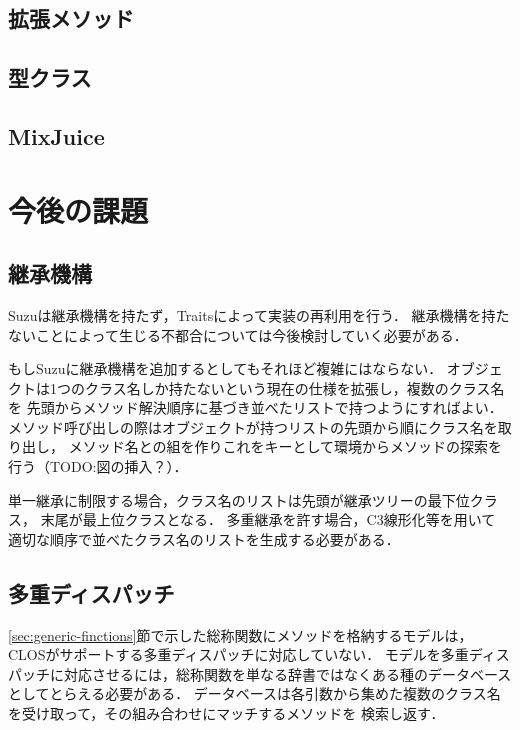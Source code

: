 \documentclass{ipsjprosym}
\begin{document}
\subsection{拡張メソッド}

\subsection{型クラス}

\subsection{MixJuice}


\section{今後の課題}

\subsection{継承機構}

Suzuは継承機構を持たず，Traitsによって実装の再利用を行う．
継承機構を持たないことによって生じる不都合については今後検討していく必要がある．

もしSuzuに継承機構を追加するとしてもそれほど複雑にはならない．
オブジェクトは1つのクラス名しか持たないという現在の仕様を拡張し，複数のクラス名を
先頭からメソッド解決順序に基づき並べたリストで持つようにすればよい．
メソッド呼び出しの際はオブジェクトが持つリストの先頭から順にクラス名を取り出し，
メソッド名との組を作りこれをキーとして環境からメソッドの探索を行う（TODO:図の挿入？）．

単一継承に制限する場合，クラス名のリストは先頭が継承ツリーの最下位クラス，
末尾が最上位クラスとなる．
多重継承を許す場合，C3線形化\cite{Barrett:1996:MSL:236337.236343}等を用いて
適切な順序で並べたクラス名のリストを生成する必要がある．

\subsection{多重ディスパッチ}
\label{sec:multiple-dispatch}

\ref{sec:generic-finctions}節で示した総称関数にメソッドを格納するモデルは，
CLOSがサポートする多重ディスパッチに対応していない．
モデルを多重ディスパッチに対応させるには，総称関数を単なる辞書ではなくある種のデータベース
としてとらえる必要がある．
データベースは各引数から集めた複数のクラス名を受け取って，その組み合わせにマッチするメソッドを
検索し返す．
\end{document}
